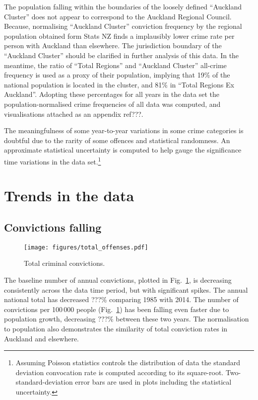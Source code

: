 \documentclass[onecolumn]{mysimple}
\begin{document}
The population falling within the boundaries of the loosely defined ``Auckland Cluster'' does not appear to correspond to the Auckland Regional Council.
Because, normalising ``Auckland Cluster'' conviction frequency by the regional population obtained form Stats NZ finds a implausibly lower crime rate per person with Auckland than elsewhere.
The jurisdiction boundary of the ``Auckland Cluster'' should be clarified in further analysis of this data.
In the meantime, the ratio of ``Total Regions'' and ``Auckland Cluster'' all-crime frequency is used as a proxy of their population, implying that 19\% of the national population is located in the cluster, and 81\% in ``Total Regions Ex Auckland''.
Adopting these percentages for all years in the data set the population-normalised crime frequencies of all data was computed, and visualisations attached as an appendix ref???.

The meaningfulness of some year-to-year variations in some crime categories is doubtful due to the rarity of some offences and statistical randomness.
An approximate statistical uncertainty is computed to help gauge the significance time variations in the data set.\footnote{Assuming Poisson statistics controls the distribution of data the standard deviation convocation rate is computed according to its square-root.  
Two-standard-deviation error bars are used in plots including the statistical uncertainty.}

\section*{Trends in the data}

\subsection*{Convictions falling}
\begin{figure}
  \centering
  \texttt{[image: figures/total\_offenses.pdf]}
  \caption{Total criminal convictions.}
  \label{fig:total crime}
\end{figure}

The baseline number of annual convictions, plotted in Fig.~\ref{fig:total crime}, is decreasing consistently across the data time period, but with significant spikes.
The annual national total has decreased ???\% comparing 1985 with 2014.
The number of convictions per 100$\,$000 people (Fig.~\ref{fig:total crime}) has been falling even faster due to population growth, decreasing ???\% between these two years.
The normalisation to population also demonstrates the similarity of total conviction rates in Auckland and elsewhere.
\end{document}
